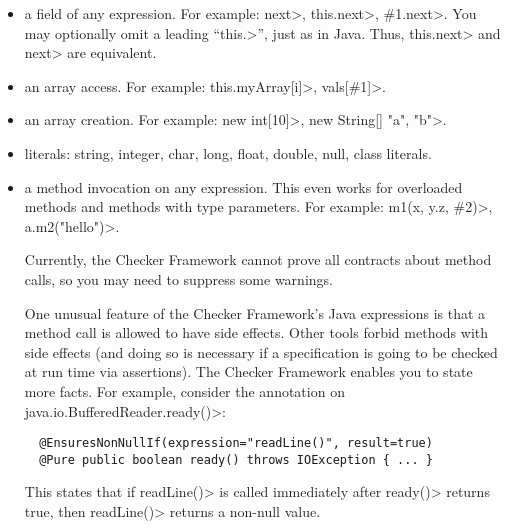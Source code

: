 \begin{itemize}
\item
  a field of any expression.  For example:  \<next>,
  \<this.next>, \<\#1.next>. %
  You may optionally omit a leading ``\<this.>'', just as in Java.  Thus,
  \<this.next> and \<next> are equivalent.

\item
  an array access.  For example:  \<this.myArray[i]>, \<vals[\#1]>.

\item
  an array creation. For example: \<new int[10]>, \<new String[] {"a", "b"}>.

\item literals: string, integer, char, long, float, double, null, class literals.

\item a method invocation on any expression.
  This even works for overloaded methods and methods with type parameters.
  For example:
  \<m1(x, y.z, \#2)>, \<a.m2("hello")>.

  Currently, the Checker Framework cannot prove all contracts about method
  calls, so you may need to suppress some warnings.

  One unusual feature of the Checker Framework's Java expressions is that a
  method call is allowed to have side effects.  Other tools forbid methods
  with side effects (and doing so is necessary if a specification is going
  to be checked at run time via assertions).  The Checker Framework enables
  you to state more facts.  For example, consider the annotation on
  \<java.io.BufferedReader.ready()>:

\begin{Verbatim}
  @EnsuresNonNullIf(expression="readLine()", result=true)
  @Pure public boolean ready() throws IOException { ... }
\end{Verbatim}

  This states that if \<readLine()> is called immediately after \<ready()>
  returns true, then \<readLine()> returns a non-null value.

\end{itemize}



